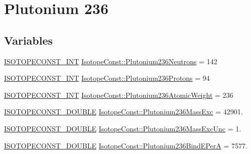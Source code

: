 \hypertarget{group___isotope_const-_plutonium-_pu236}{}\section{Plutonium 236}
\label{group___isotope_const-_plutonium-_pu236}
\subsection*{Variables}
\begin{DoxyCompactItemize}
\item 
\mbox{\hyperlink{group___isotope_const-_macros_ga5f18360b3e99483a35c32d789e62621c}{I\+S\+O\+T\+O\+P\+E\+C\+O\+N\+S\+T\+\_\+\+I\+NT}} \mbox{\hyperlink{group___isotope_const-_plutonium-_pu236_gad30cb71ad10609676960355a6b959edf}{Isotope\+Const\+::\+Plutonium236\+Neutrons}} = 142
\item 
\mbox{\hyperlink{group___isotope_const-_macros_ga5f18360b3e99483a35c32d789e62621c}{I\+S\+O\+T\+O\+P\+E\+C\+O\+N\+S\+T\+\_\+\+I\+NT}} \mbox{\hyperlink{group___isotope_const-_plutonium-_pu236_gac6a2761b1cf0f4e2f2013ecf803e23dc}{Isotope\+Const\+::\+Plutonium236\+Protons}} = 94
\item 
\mbox{\hyperlink{group___isotope_const-_macros_ga5f18360b3e99483a35c32d789e62621c}{I\+S\+O\+T\+O\+P\+E\+C\+O\+N\+S\+T\+\_\+\+I\+NT}} \mbox{\hyperlink{group___isotope_const-_plutonium-_pu236_ga3204494d1d8f628b6a8ce65a95d7260c}{Isotope\+Const\+::\+Plutonium236\+Atomic\+Weight}} = 236
\item 
\mbox{\hyperlink{group___isotope_const-_macros_ga8f45a7272ce02c0b4c65c44636ed719a}{I\+S\+O\+T\+O\+P\+E\+C\+O\+N\+S\+T\+\_\+\+D\+O\+U\+B\+LE}} \mbox{\hyperlink{group___isotope_const-_plutonium-_pu236_ga8ac63f6fe6641a20a5f220f72398a97e}{Isotope\+Const\+::\+Plutonium236\+Mass\+Exc}} = 42901.
\item 
\mbox{\hyperlink{group___isotope_const-_macros_ga8f45a7272ce02c0b4c65c44636ed719a}{I\+S\+O\+T\+O\+P\+E\+C\+O\+N\+S\+T\+\_\+\+D\+O\+U\+B\+LE}} \mbox{\hyperlink{group___isotope_const-_plutonium-_pu236_ga1857496a491649c44047c2906d39c14c}{Isotope\+Const\+::\+Plutonium236\+Mass\+Exc\+Unc}} = 1.
\item 
\mbox{\hyperlink{group___isotope_const-_macros_ga8f45a7272ce02c0b4c65c44636ed719a}{I\+S\+O\+T\+O\+P\+E\+C\+O\+N\+S\+T\+\_\+\+D\+O\+U\+B\+LE}} \mbox{\hyperlink{group___isotope_const-_plutonium-_pu236_ga8c6ff369860814197b68503b9d7bb535}{Isotope\+Const\+::\+Plutonium236\+Bind\+E\+PerA}} = 7577.
\item 

\end{DoxyCompactItemize}
